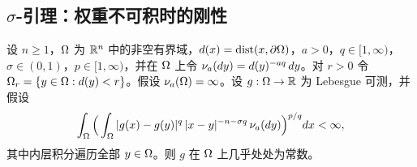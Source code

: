 \subsection{\texorpdfstring{$\sigma$}{sigma}-引理：权重不可积时的刚性}

\begin{lemma}
设 $n\ge 1$，$\Omega$ 为 $\mathbb{R}^n$ 中的非空有界域，$d(x)=\operatorname{dist}(x,\partial\Omega)$，$a>0$，$q\in[1,\infty)$，$\sigma\in(0,1)$，$p\in[1,\infty)$，并在 $\Omega$ 上令 $\nu_{a}(dy)=d(y)^{-aq}\,dy$。对 $r>0$ 令 $\Omega_{r}=\{y\in\Omega : d(y)<r\}$。假设 $\nu_{a}(\Omega)=\infty$。设 $g:\Omega\to\mathbb{R}$ 为 Lebesgue 可测，并假设
\[
  \int_\Omega \Big(\int_\Omega |g(x)-g(y)|^q\,|x-y|^{-n-\sigma q}\,\nu_{a}(dy)\Big)^{p/q} dx<\infty ,
\]
其中内层积分遍历全部 $y\in\Omega$。则 $g$ 在 $\Omega$ 上几乎处处为常数。
\end{lemma}

